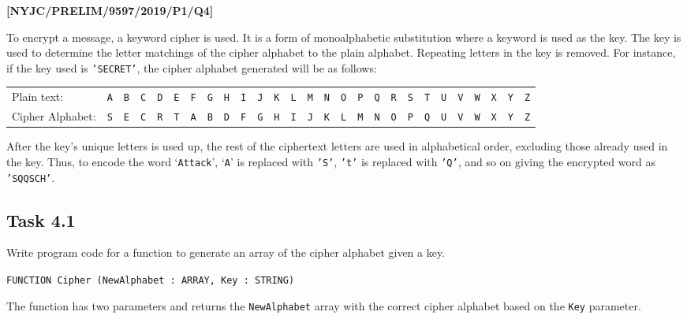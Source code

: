 \item \textbf{{[}NYJC/PRELIM/9597/2019/P1/Q4{]} }

To encrypt a message, a keyword cipher is used. It is a form of monoalphabetic
substitution where a keyword is used as the key. The key is used to
determine the letter matchings of the cipher alphabet to the plain
alphabet. Repeating letters in the key is removed. For instance, if
the key used is \texttt{'SECRET'}, the cipher alphabet generated will
be as follows: 

\begin{tabular}{lcccccccccccccccccccccccccc}
Plain text: & \texttt{A} & \texttt{B} & \texttt{C} & \texttt{D} & \texttt{E} & \texttt{F} & \texttt{G} & \texttt{H} & \texttt{I} & \texttt{J} & \texttt{K} & \texttt{L} & \texttt{M} & \texttt{N} & \texttt{O} & \texttt{P} & \texttt{Q} & \texttt{R} & \texttt{S} & \texttt{T} & \texttt{U} & \texttt{V} & \texttt{W} & \texttt{X} & \texttt{Y} & \texttt{Z}\tabularnewline
Cipher Alphabet: & \texttt{S} & \texttt{E} & \texttt{C} & \texttt{R} & \texttt{T} & \texttt{A} & \texttt{B} & \texttt{D} & \texttt{F} & \texttt{G} & \texttt{H} & \texttt{I} & \texttt{J} & \texttt{K} & \texttt{L} & \texttt{M} & \texttt{N} & \texttt{O} & \texttt{P} & \texttt{Q} & \texttt{U} & \texttt{V} & \texttt{W} & \texttt{X} & \texttt{Y} & \texttt{Z}\tabularnewline
\end{tabular}

After the key\textquoteright s unique letters is used up, the rest
of the ciphertext letters are used in alphabetical order, excluding
those already used in the key. Thus, to encode the word \textquoteleft \texttt{Attack}\textquoteright ,
\textquoteleft \texttt{A}\textquoteright{} is replaced with \texttt{'S'},
\texttt{'t'} is replaced with \texttt{'Q'}, and so on giving the encrypted
word as \texttt{'SQQSCH'}. 

\subsection*{Task 4.1 }

Write program code for a function to generate an array of the cipher
alphabet given a key. 
\noindent \begin{center}
\texttt{FUNCTION Cipher (NewAlphabet : ARRAY, Key : STRING) }
\par\end{center}

The function has two parameters and returns the \texttt{NewAlphabet}
array with the correct cipher alphabet based on the \texttt{Key} parameter. 

